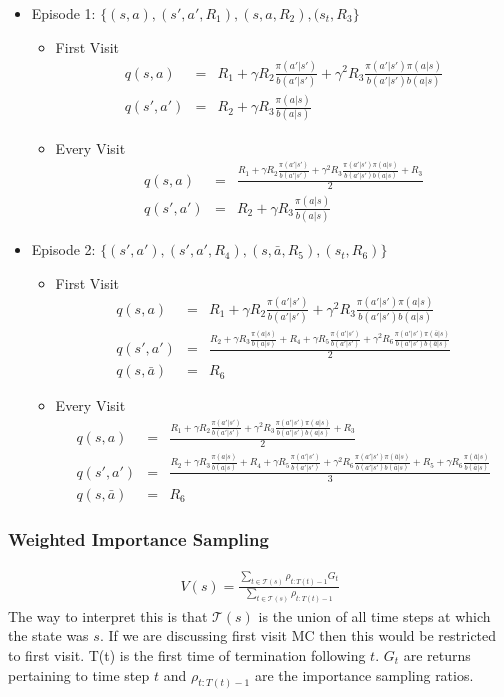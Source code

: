 \documentclass[11pt,a4paper]{article}
\newcommand\bea{\begin{eqnarray}}
\newcommand\eea{\end{eqnarray}}
\begin{document}
\begin{itemize}
\item Episode 1: $\{(s,a),(s',a',R_1),(s,a,R_2),(s_t,R_3\}$ 
\begin{itemize}
\item First Visit
\bea
q(s,a) &=& R_1 + \gamma R_2 \frac{\pi(a'|s')}{b(a'|s')} +\gamma^2 R_3 \frac{\pi(a'|s') \pi(a|s)}{b(a'|s') b(a|s)} \\
q(s',a') &=& R_2 + \gamma R_3 \frac{\pi(a|s)}{b(a|s)}
\eea
\item Every Visit
\bea
q(s,a) &=& \frac{R_1 + \gamma R_2 \frac{\pi(a'|s')}{b(a'|s')} +\gamma^2 R_3 \frac{\pi(a'|s') \pi(a|s)}{b(a'|s') b(a|s)} +R_3}{2} \\
q(s',a') &=& R_2 + \gamma R_3 \frac{\pi(a|s)}{b(a|s)}
\eea
\end{itemize}
\item  Episode 2: $\{(s',a'),(s',a',R_4),(s,\bar a,R_5),(s_t,R_6)\}$
\begin{itemize}
\item First Visit
\bea
q(s,a) &=&R_1 + \gamma R_2 \frac{\pi(a'|s')}{b(a'|s')} +\gamma^2 R_3 \frac{\pi(a'|s') \pi(a|s)}{b(a'|s') b(a|s)} \\
q(s',a') &=& \frac{R_2 + \gamma R_3 \frac{\pi(a|s)}{b(a|s)} + R_4 + \gamma R_5 \frac{\pi(a'|s') }{b(a'|s') } + \gamma^2 R_6 \frac{\pi(a'|s') \pi(\bar a|s)}{b(a'|s') b(\bar a|s)}}{2} \\
q(s,\bar a) &=& R_6
\eea
\item Every Visit
\bea
q(s,a) &=&  \frac{R_1 + \gamma R_2 \frac{\pi(a'|s')}{b(a'|s')} +\gamma^2 R_3 \frac{\pi(a'|s') \pi(a|s)}{b(a'|s') b(a|s)} +R_3}{2} \\
q(s',a') &=& \frac{R_2 + \gamma R_3 \frac{\pi(a|s)}{b(a|s)} + R_4 + \gamma R_5 \frac{\pi(a'|s') }{b(a'|s') } + \gamma^2 R_6 \frac{\pi(a'|s') \pi(\bar a|s)}{b(a'|s') b(\bar a|s)} + R_5+ \gamma R_6 \frac{ \pi(\bar a|s)}{ b(\bar a|s)}}{3} \\
q(s,\bar a) &=& R_6
\eea
\end{itemize}
\end{itemize}


\subsubsection{Weighted Importance Sampling}

\bea
V(s) = \frac{\sum_{t \in \mathcal T(s)} \rho_{t:T(t)-1} G_t}{\sum_{t \in \mathcal T(s)} \rho_{t:T(t)-1} }
\eea
The way to interpret this is that $\mathcal T(s)$ is the union of all time steps at which the state was $s$.  If we are discussing first visit MC then this would be restricted to first visit. T(t) is the first time of termination following $t$. $G_t$ are returns pertaining to time step $t$ and $ \rho_{t:T(t)-1}$ are the importance sampling ratios.
\end{document}
